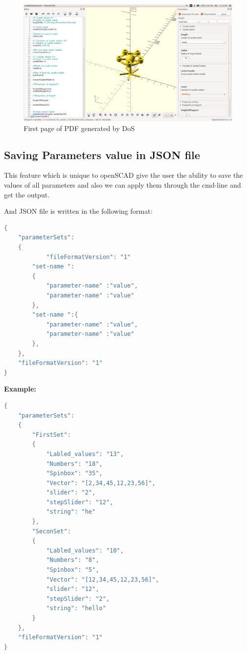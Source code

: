 \begin{figure}[H]
    \centering \includegraphics[scale=0.31]{images/output/6.png}
    \caption{First page of PDF generated by DoS}
    \label{fig:5}
\end{figure}

\subsection{ Saving Parameters value in JSON file}
This feature which is unique to openSCAD give the user the ability to save the values of all parameters and also we can apply them through the cmd-line and get the output.

And JSON file is written in the following format:

\begin{lstlisting}[language=Java]
{
    "parameterSets":
    {
            "fileFormatVersion": "1"
        "set-name ":
        {
            "parameter-name" :"value",
            "parameter-name" :"value"
        },
        "set-name ":{
            "parameter-name" :"value",
            "parameter-name" :"value"
        },
    },
    "fileFormatVersion": "1"
}
\end{lstlisting}

\textbf{Example:}
\begin{lstlisting}[language=Java]
{
    "parameterSets":
    {
        "FirstSet":
        {
            "Labled_values": "13",
            "Numbers": "18",
            "Spinbox": "35",
            "Vector": "[2,34,45,12,23,56]",
            "slider": "2",
            "stepSlider": "12",
            "string": "he"
        },
        "SeconSet":
        {
            "Labled_values": "10",
            "Numbers": "8",
            "Spinbox": "5",
            "Vector": "[12,34,45,12,23,56]",
            "slider": "12",
            "stepSlider": "2",
            "string": "hello"
        }
    },
    "fileFormatVersion": "1"
}
\end{lstlisting}

